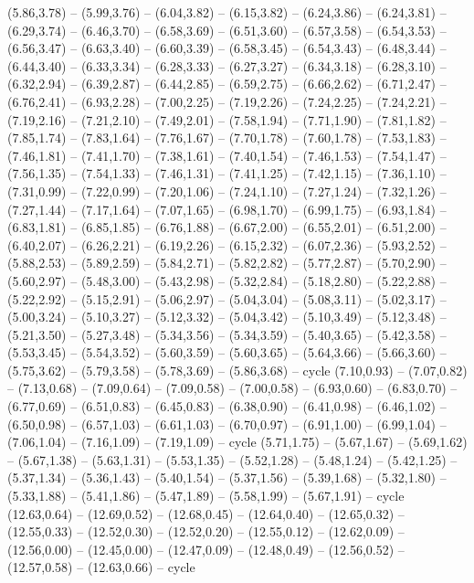 \expandafter\def\csname geo:gebiet:ITA\endcsname{
  (5.86,3.78) -- (5.99,3.76) -- (6.04,3.82) -- (6.15,3.82) -- (6.24,3.86) -- (6.24,3.81) -- (6.29,3.74) -- (6.46,3.70) -- (6.58,3.69) -- (6.51,3.60) -- (6.57,3.58) -- (6.54,3.53) -- (6.56,3.47) -- (6.63,3.40) -- (6.60,3.39) -- (6.58,3.45) -- (6.54,3.43) -- (6.48,3.44) -- (6.44,3.40) -- (6.33,3.34) -- (6.28,3.33) -- (6.27,3.27) -- (6.34,3.18) -- (6.28,3.10) -- (6.32,2.94) -- (6.39,2.87) -- (6.44,2.85) -- (6.59,2.75) -- (6.66,2.62) -- (6.71,2.47) -- (6.76,2.41) -- (6.93,2.28) -- (7.00,2.25) -- (7.19,2.26) -- (7.24,2.25) -- (7.24,2.21) -- (7.19,2.16) -- (7.21,2.10) -- (7.49,2.01) -- (7.58,1.94) -- (7.71,1.90) -- (7.81,1.82) -- (7.85,1.74) -- (7.83,1.64) -- (7.76,1.67) -- (7.70,1.78) -- (7.60,1.78) -- (7.53,1.83) -- (7.46,1.81) -- (7.41,1.70) -- (7.38,1.61) -- (7.40,1.54) -- (7.46,1.53) -- (7.54,1.47) -- (7.56,1.35) -- (7.54,1.33) -- (7.46,1.31) -- (7.41,1.25) -- (7.42,1.15) -- (7.36,1.10) -- (7.31,0.99) -- (7.22,0.99) -- (7.20,1.06) -- (7.24,1.10) -- (7.27,1.24) -- (7.32,1.26) -- (7.27,1.44) -- (7.17,1.64) -- (7.07,1.65) -- (6.98,1.70) -- (6.99,1.75) -- (6.93,1.84) -- (6.83,1.81) -- (6.85,1.85) -- (6.76,1.88) -- (6.67,2.00) -- (6.55,2.01) -- (6.51,2.00) -- (6.40,2.07) -- (6.26,2.21) -- (6.19,2.26) -- (6.15,2.32) -- (6.07,2.36) -- (5.93,2.52) -- (5.88,2.53) -- (5.89,2.59) -- (5.84,2.71) -- (5.82,2.82) -- (5.77,2.87) -- (5.70,2.90) -- (5.60,2.97) -- (5.48,3.00) -- (5.43,2.98) -- (5.32,2.84) -- (5.18,2.80) -- (5.22,2.88) -- (5.22,2.92) -- (5.15,2.91) -- (5.06,2.97) -- (5.04,3.04) -- (5.08,3.11) -- (5.02,3.17) -- (5.00,3.24) -- (5.10,3.27) -- (5.12,3.32) -- (5.04,3.42) -- (5.10,3.49) -- (5.12,3.48) -- (5.21,3.50) -- (5.27,3.48) -- (5.34,3.56) -- (5.34,3.59) -- (5.40,3.65) -- (5.42,3.58) -- (5.53,3.45) -- (5.54,3.52) -- (5.60,3.59) -- (5.60,3.65) -- (5.64,3.66) -- (5.66,3.60) -- (5.75,3.62) -- (5.79,3.58) -- (5.78,3.69) -- (5.86,3.68) -- cycle
  (7.10,0.93) -- (7.07,0.82) -- (7.13,0.68) -- (7.09,0.64) -- (7.09,0.58) -- (7.00,0.58) -- (6.93,0.60) -- (6.83,0.70) -- (6.77,0.69) -- (6.51,0.83) -- (6.45,0.83) -- (6.38,0.90) -- (6.41,0.98) -- (6.46,1.02) -- (6.50,0.98) -- (6.57,1.03) -- (6.61,1.03) -- (6.70,0.97) -- (6.91,1.00) -- (6.99,1.04) -- (7.06,1.04) -- (7.16,1.09) -- (7.19,1.09) -- cycle
  (5.71,1.75) -- (5.67,1.67) -- (5.69,1.62) -- (5.67,1.38) -- (5.63,1.31) -- (5.53,1.35) -- (5.52,1.28) -- (5.48,1.24) -- (5.42,1.25) -- (5.37,1.34) -- (5.36,1.43) -- (5.40,1.54) -- (5.37,1.56) -- (5.39,1.68) -- (5.32,1.80) -- (5.33,1.88) -- (5.41,1.86) -- (5.47,1.89) -- (5.58,1.99) -- (5.67,1.91) -- cycle}
\expandafter\def\csname geo:gebiet:ISR\endcsname{
  (12.63,0.64) -- (12.69,0.52) -- (12.68,0.45) -- (12.64,0.40) -- (12.65,0.32) -- (12.55,0.33) -- (12.52,0.30) -- (12.52,0.20) -- (12.55,0.12) -- (12.62,0.09) -- (12.56,0.00) -- (12.45,0.00) -- (12.47,0.09) -- (12.48,0.49) -- (12.56,0.52) -- (12.57,0.58) -- (12.63,0.66) -- cycle}
